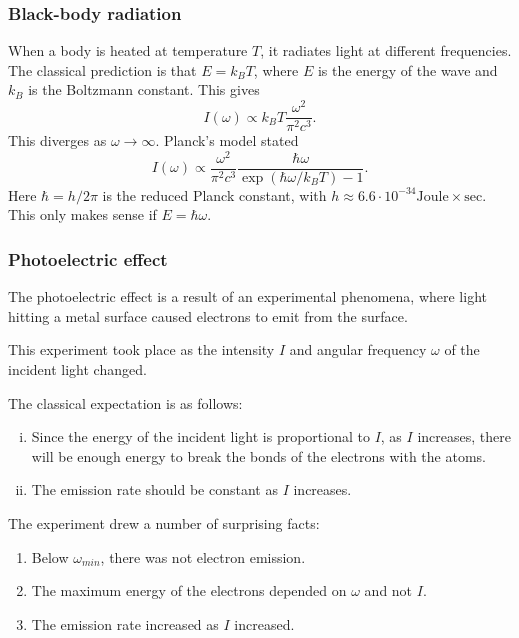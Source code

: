 \documentclass[12pt]{article}
\theoremstyle{definition}
\theoremstyle{remark}
\begin{document}
\subsubsection{Black-body radiation}%
\label{subsub:black_body_radiation}

When a body is heated at temperature $T$, it radiates light at different frequencies. The classical prediction is that $E = k_B T$, where $E$ is the energy of the wave and $k_B$ is the Boltzmann constant. This gives
\[
	I(\omega) \propto k_B T \frac{\omega^2}{\pi^2 c^3}
.\]
This diverges as $\omega \to \infty$. Planck's model stated
\[
	I(\omega) \propto \frac{\omega^2}{\pi^2 c^3} \frac{\hbar \omega}{\exp(\hbar \omega / k_B T) - 1}
.\]
Here $\hbar = h/2\pi$ is the reduced Planck constant, with $h \approx 6.6 \cdot 10^{-34} \text{Joule} \times \text{sec}$. This only makes sense if $E = \hbar \omega$.

\subsubsection{Photoelectric effect}%
\label{subsub:photoelectric_effect}

The photoelectric effect is a result of an experimental phenomena, where light hitting a metal surface caused electrons to emit from the surface.

This experiment took place as the intensity $I$ and angular frequency $\omega$ of the incident light changed.

The classical expectation is as follows:
\begin{enumerate}[(i)]
	\item Since the energy of the incident light is proportional to $I$, as $I$ increases, there will be enough energy to break the bonds of the electrons with the atoms.
	\item The emission rate should be constant as $I$ increases.
\end{enumerate}

The experiment drew a number of surprising facts:
\begin{enumerate}[1.]
	\item Below $\omega_{min}$, there was not electron emission.
	\item The maximum energy of the electrons depended on $\omega$ and not $I$.
	\item The emission rate increased as $I$ increased.
\end{enumerate}
\end{document}
